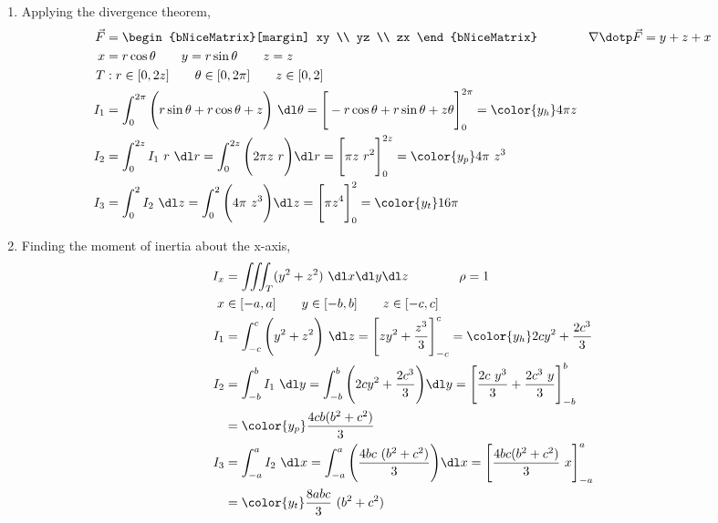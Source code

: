 \begin{enumerate}
    \item Applying the divergence theorem,
          \begin{align}
              \vec{F} & = \begin{bNiceMatrix}[margin]
                              xy \\ yz \\ zx
                          \end{bNiceMatrix} \qquad\qquad
              \nabla \dotp \vec{F} = y + z + x                              \\
              x       & = r\cos \theta \qquad y = r\sin \theta
              \qquad z = z                                                  \\
              T       & : r \in [0, 2z] \qquad \theta \in [0, 2\pi] \qquad
              z \in [0, 2]                                                  \\
              I_1     & = \int_{0}^{2\pi} \Bigg(r\sin \theta + r\cos \theta
              + z\Bigg)
              \ \dl \theta
              = \Bigg[ -r\cos \theta + r\sin \theta + z \theta \Bigg]_{0}^{2\pi}
              = {\color{y_h} 4\pi z}                                        \\
              I_2     & = \int_{0}^{2z} I_1 \ r\ \dl r
              = \int_{0}^{2z} \Bigg( 2\pi z\ r \Bigg) \dl r
              = \Bigg[ \pi z\ r^2 \Bigg]_{0}^{2z}
              = {\color{y_p} 4\pi\ z^3 }                                    \\
              I_3     & = \int_{0}^{2} I_2\ \dl z = \int_{0}^{2}
              \Bigg( 4\pi\ z^3 \Bigg) \dl z
              = \Bigg[ \pi z^4 \Bigg]_{0}^{2}
              = {\color{y_t} 16\pi}
          \end{align}

    \item Finding the moment of inertia about the x-axis,
          \begin{align}
              I_x & = \iiint_T (y^2 + z^2)\ \dl x \dl y \dl z \qquad\qquad \rho = 1 \\
              x   & \in [-a, a] \qquad y \in [-b, b] \qquad z \in [-c, c]           \\
              I_1 & = \int_{-c}^{c} \Bigg(y^2 + z^2\Bigg)\ \dl z
              = \Bigg[ zy^2 + \frac{z^3}{3} \Bigg]_{-c}^{c}
              = {\color{y_h} 2cy^2 + \frac{2c^3}{3}}                                \\
              I_2 & = \int_{-b}^{b} I_1 \ \dl y
              = \int_{-b}^{b} \Bigg( 2cy^2 + \frac{2c^3}{3} \Bigg) \dl y
              = \Bigg[ \frac{2c\ y^3}{3} + \frac{2c^3\ y}{3} \Bigg]_{-b}^{b}        \\
                  & = {\color{y_p} \frac{4cb(b^2 + c^2)}{3} }                       \\
              I_3 & = \int_{-a}^{a} I_2\ \dl x = \int_{-a}^{a}
              \Bigg( \frac{4bc\ (b^2 + c^2)}{3} \Bigg) \dl x
              = \Bigg[ \frac{4bc (b^2 + c^2)}{3}\ x \Bigg]_{-a}^{a}                 \\
                  & = {\color{y_t} \frac{8abc}{3}\ (b^2 + c^2)}
          \end{align}


\end{enumerate}
